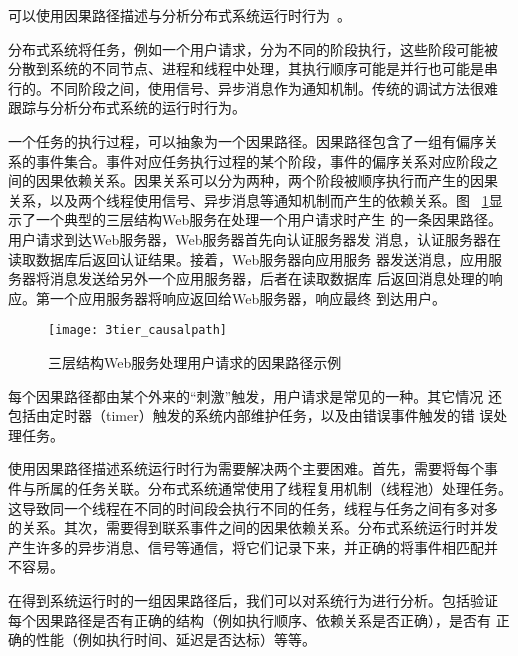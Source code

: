 
可以使用因果路径描述与分析分布式系统运行时行为~\cite{pinpoint, magpie,
pip, x-trace, project5}。

分布式系统将任务，例如一个用户请求，分为不同的阶段执行，这些阶段可能被
分散到系统的不同节点、进程和线程中处理，其执行顺序可能是并行也可能是串
行的。不同阶段之间，使用信号、异步消息作为通知机制。传统的调试方法很难
跟踪与分析分布式系统的运行时行为。

一个任务的执行过程，可以抽象为一个因果路径。因果路径包含了一组有偏序关
系的事件集合。事件对应任务执行过程的某个阶段，事件的偏序关系对应阶段之
间的因果依赖关系。因果关系可以分为两种，两个阶段被顺序执行而产生的因果
关系，以及两个线程使用信号、异步消息等通知机制而产生的依赖关系。图~
\ref{fig:3tier}显示了一个典型的三层结构Web服务在处理一个用户请求时产生
的一条因果路径。用户请求到达Web服务器，Web服务器首先向认证服务器发
消息，认证服务器在读取数据库后返回认证结果。接着，Web服务器向应用服务
器发送消息，应用服务器将消息发送给另外一个应用服务器，后者在读取数据库
后返回消息处理的响应。第一个应用服务器将响应返回给Web服务器，响应最终
到达用户。

\begin{figure}
\centering
\texttt{[image: 3tier\_causalpath]}
\caption{三层结构Web服务处理用户请求的因果路径示例}
\label{fig:3tier}
\end{figure}

每个因果路径都由某个外来的“刺激”触发，用户请求是常见的一种。其它情况
还包括由定时器（timer）触发的系统内部维护任务，以及由错误事件触发的错
误处理任务。

使用因果路径描述系统运行时行为需要解决两个主要困难。首先，需要将每个事
件与所属的任务关联。分布式系统通常使用了线程复用机制（线程池）处理任务。
这导致同一个线程在不同的时间段会执行不同的任务，线程与任务之间有多对多
的关系。其次，需要得到联系事件之间的因果依赖关系。分布式系统运行时并发
产生许多的异步消息、信号等通信，将它们记录下来，并正确的将事件相匹配并
不容易。

在得到系统运行时的一组因果路径后，我们可以对系统行为进行分析。包括验证
每个因果路径是否有正确的结构（例如执行顺序、依赖关系是否正确），是否有
正确的性能（例如执行时间、延迟是否达标）等等。

% 


